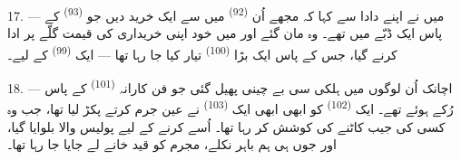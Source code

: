 \VUsaut{4.4mm}
\VUsaut{2.8mm}

17. --- میں نے اپنے دادا سے کہا کہ مجھے اُن 
\textsuperscript{(92)} میں سے ایک خرید دیں جو 
\textsuperscript{(93)} کے پاس ایک ڈبّے میں تھے۔ وہ مان گئے اور میں خود
اپنی خریداری کی قیمت گلّے پر ادا کرنے گیا، جس کے پاس ایک بڑا
 \textsuperscript{(100)} تیار کیا جا رہا تھا —
ایک  \textsuperscript{(99)} کے لیے۔

18. --- اچانک اُن لوگوں میں ہلکی سی بے چینی پھیل گئی جو فن کارانہ
 \textsuperscript{(101)} کے پاس رُکے ہوئے تھے۔
ایک  \textsuperscript{(102)} کو ابھی ابھی ایک
 \textsuperscript{(103)} نے عین جرم کرتے پکڑ لیا تھا، جب
وہ کسی کی جیب کاٹنے کی کوشش کر رہا تھا۔ اُسے  کرنے کے
لیے پولیس والا بلوایا گیا، اور جوں ہی ہم باہر نکلے، مجرم کو قید خانے
لے جایا جا رہا تھا۔

\VUsaut{6.0mm}
\VUfilet{22mm}
